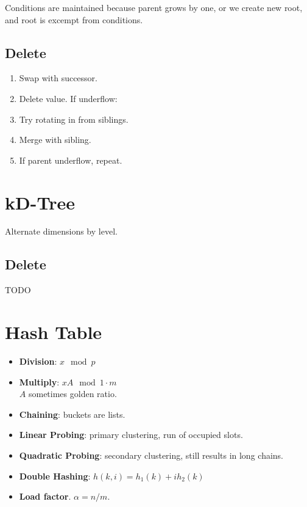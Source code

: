 \documentclass[11pt]{article}
\begin{document}
\begin{multicols}{4}
Conditions are maintained because parent grows by one, or we create new root,
and root is excempt from conditions.

\subsection{Delete}

\begin{enumerate}
	\item Swap with successor.
	\item Delete value. If underflow:
	\item Try rotating in from siblings.
	\item Merge with sibling.
	\item If parent underflow, repeat.
\end{enumerate}

\section{kD-Tree}

Alternate dimensions by level.

\subsection{Delete}

TODO

\section{Hash Table}

\begin{itemize}
	\item \textbf{Division}: $x \mod{p}$
	\item \textbf{Multiply}: $xA \mod{1} \cdot m$ \\
		$A$ sometimes golden ratio.
\end{itemize}

\begin{itemize}
	\item \textbf{Chaining}: buckets are lists.
	\item \textbf{Linear Probing}: primary clustering, run of occupied
		slots.
	\item \textbf{Quadratic Probing}: secondary clustering, still results
		in long chains.
	\item \textbf{Double Hashing}: $h(k, i) = h_1(k) + ih_2(k)$
	\item \textbf{Load factor}. $\alpha = n/m$.
\end{itemize}


\end{multicols}
\end{document}
